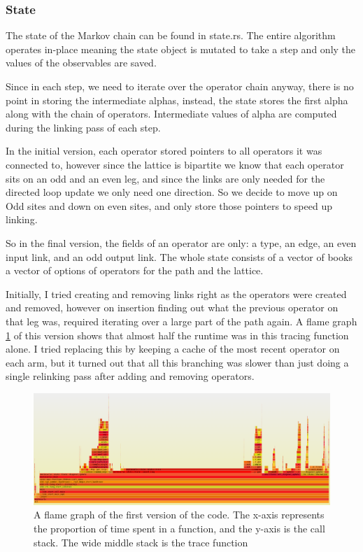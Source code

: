 \documentclass[ngerman]{scrartcl}
\begin{document}
\subsubsection*{State}
The state of the Markov chain can be found in state.rs. The entire algorithm operates in-place meaning the state object is mutated to take a step and only the values of the observables are saved.

Since in each step, we need to iterate over the operator chain anyway, there is no point in storing the intermediate alphas, instead, the state stores the first alpha along with the chain of operators. Intermediate values of alpha are computed during the linking pass of each step.

In the initial version, each operator stored pointers to all operators it was connected to, however since the lattice is bipartite we know that each operator sits on an odd and an even leg, and since the links are only needed for the directed loop update we only need one direction. So we decide to move up on Odd sites and down on even sites, and only store those pointers to speed up linking.

So in the final version, the fields of an operator are only: a type, an edge, an even input link, and an odd output link. The whole state consists of a vector of books a vector of options of operators for the path and the lattice.

Initially, I tried creating and removing links right as the operators were created and removed, however on insertion finding out what the previous operator on that leg was, required iterating over a large part of the path again. A flame graph \ref{fig:flame} of this version shows that almost half the runtime was in this tracing function alone. I tried replacing this by keeping a cache of the most recent operator on each arm, but it turned out that all this branching was slower than just doing a single relinking pass after adding and removing operators.
    \begin{figure}[H]
        \centering
        \includegraphics[width=1.0\textwidth]{old_flamegraph.png}
        \caption{A flame graph of the first version of the code. The x-axis represents the proportion of time spent in a function, and the y-axis is the call stack. The wide middle stack is the trace function}
        \label{fig:flame}
    \end{figure}
\end{document}
